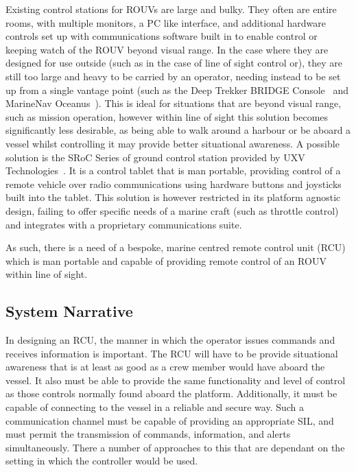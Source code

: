 \documentclass[../main.tex]{subfiles}
\begin{document}
Existing control stations for ROUVs are large and bulky.
They often are entire rooms, with multiple monitors, a PC like interface, and additional hardware controls set up with communications software built in to enable control or keeping watch of the ROUV beyond visual range.
In the case where they are designed for use outside (such as in the case of line of sight control or), they are still too large and heavy to be carried by an operator, needing instead to be set up from a single vantage point (such as the Deep Trekker BRIDGE Console~\cite{DeepTrekker2025} and MarineNav Oceanus~\cite{MARINENAV2026}).
This is ideal for situations that are beyond visual range, such as mission operation, however within line of sight this solution becomes significantly less desirable, as being able to walk around a harbour or be aboard a vessel whilst controlling it may provide better situational awareness.
A possible solution is the SRoC Series of ground control station provided by UXV Technologies~\cite{UXVTechnologies}.
It is a control tablet that is man portable, providing control of a remote vehicle over radio communications using hardware buttons and joysticks built into the tablet.
This solution is however restricted in its platform agnostic design, failing to offer specific needs of a marine craft (such as throttle control) and integrates with a proprietary communications suite.

As such, there is a need of a bespoke, marine centred remote control unit (RCU) which is man portable and capable of providing remote control of an ROUV within line of sight.

\subsection{System Narrative}\label{1.3}

In designing an RCU, the manner in which the operator issues commands and receives information is important.
The RCU will have to be provide situational awareness that is at least as good as a crew member would have aboard the vessel.
It also must be able to provide the same functionality and level of control as those controls normally found aboard the platform.
Additionally, it must be capable of connecting to the vessel in a reliable and secure way.
Such a communication channel must be capable of providing an appropriate SIL, and must permit the transmission of commands, information, and alerts simultaneously.
There a number of approaches to this that are dependant on the setting in which the controller would be used.
\end{document}

